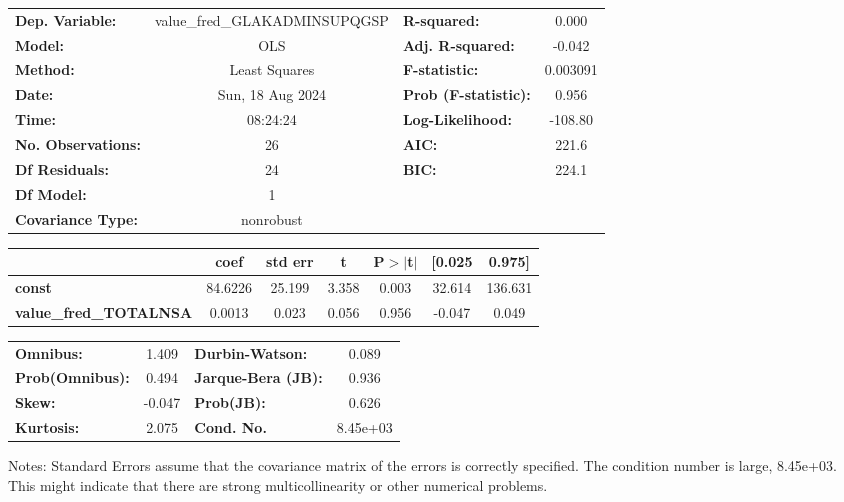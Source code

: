 \begin{center}
\begin{tabular}{lclc}
\toprule
\textbf{Dep. Variable:}        & value\_fred\_GLAKADMINSUPQGSP & \textbf{  R-squared:         } &     0.000   \\
\textbf{Model:}                &              OLS              & \textbf{  Adj. R-squared:    } &    -0.042   \\
\textbf{Method:}               &         Least Squares         & \textbf{  F-statistic:       } &  0.003091   \\
\textbf{Date:}                 &        Sun, 18 Aug 2024       & \textbf{  Prob (F-statistic):} &    0.956    \\
\textbf{Time:}                 &            08:24:24           & \textbf{  Log-Likelihood:    } &   -108.80   \\
\textbf{No. Observations:}     &                 26            & \textbf{  AIC:               } &     221.6   \\
\textbf{Df Residuals:}         &                 24            & \textbf{  BIC:               } &     224.1   \\
\textbf{Df Model:}             &                  1            & \textbf{                     } &             \\
\textbf{Covariance Type:}      &           nonrobust           & \textbf{                     } &             \\
\bottomrule
\end{tabular}
\begin{tabular}{lcccccc}
                               & \textbf{coef} & \textbf{std err} & \textbf{t} & \textbf{P$> |$t$|$} & \textbf{[0.025} & \textbf{0.975]}  \\
\midrule
\textbf{const}                 &      84.6226  &       25.199     &     3.358  &         0.003        &       32.614    &      136.631     \\
\textbf{value\_fred\_TOTALNSA} &       0.0013  &        0.023     &     0.056  &         0.956        &       -0.047    &        0.049     \\
\bottomrule
\end{tabular}
\begin{tabular}{lclc}
\textbf{Omnibus:}       &  1.409 & \textbf{  Durbin-Watson:     } &    0.089  \\
\textbf{Prob(Omnibus):} &  0.494 & \textbf{  Jarque-Bera (JB):  } &    0.936  \\
\textbf{Skew:}          & -0.047 & \textbf{  Prob(JB):          } &    0.626  \\
\textbf{Kurtosis:}      &  2.075 & \textbf{  Cond. No.          } & 8.45e+03  \\
\bottomrule
\end{tabular}
\end{center}

Notes: \newline
 [1] Standard Errors assume that the covariance matrix of the errors is correctly specified. \newline
 [2] The condition number is large, 8.45e+03. This might indicate that there are \newline
 strong multicollinearity or other numerical problems.